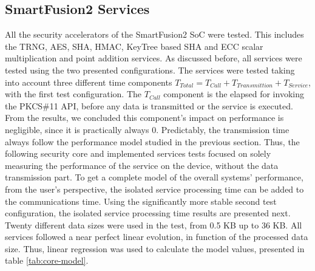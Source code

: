 \subsection{SmartFusion2 Services}\label{chap:evaluation:board}

All the security accelerators of the SmartFusion2 SoC were tested. This includes the TRNG, AES, SHA, HMAC, KeyTree based SHA and ECC scalar multiplication and point addition services.
As discussed before, all services were tested using the two presented configurations. The services were tested taking into account three different time components \(T_{Total} = T_{Call} + T_{Transmittion} + T_{Service}\), with the first test configuration. The \(T_{Call}\) component is the elapsed for invoking the PKCS\#11 API, before any data is transmitted or the service is executed. From the results, we concluded this component's impact on performance is negligible, since it is practically always 0.
Predictably, the transmission time always follow the performance model studied in the previous section.
Thus, the following security core and implemented services tests focused on solely measuring the performance of the service on the device, without the data transmission part. To get a complete model of the overall systems' performance, from the user's perspective, the isolated service processing time can be added to the communications time.
Using the significantly more stable second test configuration, the isolated service processing time results are presented next.
Twenty different data sizes were used in the test, from 0.5 KB up to 36 KB.
All services followed a near perfect linear evolution, in function of the processed data size. Thus, linear regression was used to calculate the model values, presented in table \ref{tab:core-model}.



